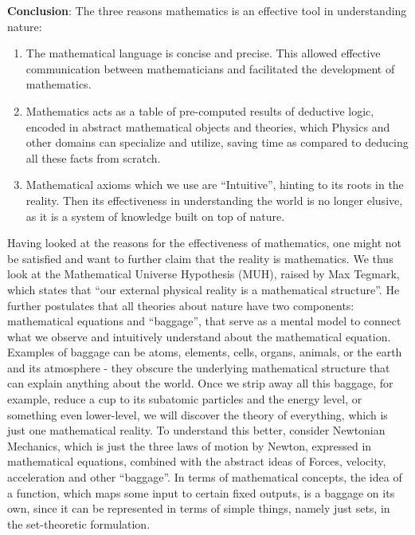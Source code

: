 \documentclass[a4paper]{article}
\newcommand{\0}{\{\}}
\newcommand{\1}{\{\0\}}
\newcommand{\2}{\{\0,\1\}}
\newcommand{\3}{\{\0,\1,\2\}}
\newcommand{\4}{\{\0,\1,\2,\3\}}
\newcommand{\5}{\{\0,\1,\2,\3,\4\}}
\begin{document}
\textbf{Conclusion}: The three reasons mathematics is an effective tool in
understanding nature:
\begin{enumerate}
  \item The mathematical language is concise and precise. This allowed effective
    communication between mathematicians and facilitated the development of
    mathematics.
  \item Mathematics acts as a table of pre-computed results of deductive logic,
    encoded in abstract mathematical objects and theories, which Physics and
    other domains can specialize and utilize, saving time as compared to
    deducing all these facts from scratch.
  \item Mathematical axioms which we use are “Intuitive”, hinting to its roots
    in the reality. Then its effectiveness in understanding the world is no
    longer elusive, as it is a system of knowledge built on top of nature.
\end{enumerate}

Having looked at the reasons for the effectiveness of mathematics, one might not
be satisfied and want to further claim that the reality is mathematics. We thus
look at the Mathematical Universe Hypothesis (MUH), raised by Max Tegmark, which
states that “our external physical reality is a mathematical structure”. He
further postulates that all theories about nature have two components:
mathematical equations and “baggage”, that serve as a mental model to connect
what we observe and intuitively understand about the mathematical equation.
Examples of baggage can be atoms, elements, cells, organs, animals, or the earth
and its atmosphere - they obscure the underlying mathematical structure that can
explain anything about the world. Once we strip away all this baggage, for
example, reduce a cup to its subatomic particles and the energy level, or
something even lower-level, we will discover the theory of everything, which is
just one mathematical reality. To understand this better, consider Newtonian
Mechanics, which is just the three laws of motion by Newton, expressed in
mathematical equations, combined with the abstract ideas of Forces, velocity,
acceleration and other “baggage”. In terms of mathematical concepts, the idea of
a function, which maps some input to certain fixed outputs, is a baggage on its
own, since it can be represented in terms of simple things, namely just sets, in
the set-theoretic formulation.
\end{document}
